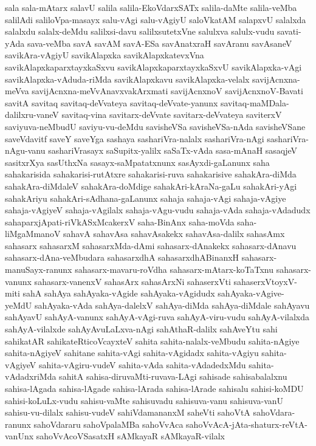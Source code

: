 {sala
sala-mAtarx
salavU
salila
salila-EkoVdarxSATx
salila-daMte
salila-veMba
salilAdi
saliloVpa-masayx
salu-vAgi
salu-vAgiyU
saloVkatAM
salapxvU
salalxda
salalxdu
salalx-deMdu
salilxsi-davu
salilxsutetxVne
salulxva
salulx-vudu
savati-yAda
sava-veMba
savA
savAM
savA-ESa
savAnatxraH
savAranu
savAsaneV
savikAra-vAgiyU
savikAlapxka
savikAlapxkatevxVna
savikAlapxkaparxtayxkaSxvu
savikAlapxkaparxtayxkaSxvU
savikAlapxka-vAgi
savikAlapxka-vAduda-riMda
savikAlapxkavu
savikAlapxka-velalx
savijAcnxna-meVva
savijAcnxna-meVvAnavxvakArxmati
savijAcnxnoV
savijAcnxnoV-Bavati
savitA
savitaq
savitaq-deVvateya
savitaq-deVvate-yanunx
savitaq-maMDala-dalilxru-vaneV
savitaq-vina
savitarx-deVvate
savitarx-deVvateya
saviterxV
saviyuva-neMbudU
saviyu-vu-deMdu
savisheVSa
savisheVSa-nAda
savisheVSane
saveVdavitf
saveY
saveYga
sashaya
sashariVra-nalalx
sashariVra-nAgi
sashariVra-nAgu-vanu
sashariVrasayx
saSupitx-yalilx
saSaTx-vAda
sasa-mAnaH
sasaqjeV
sasitxrXya
sasUthxNa
sasayx-saMpatatxnunx
sasAyxdi-gaLanunx
saha
sahakarisida
sahakarisi-rutAtxre
sahakarisi-ruva
sahakarisive
sahakAra-diMda
sahakAra-diMdaleV
sahakAra-doMdige
sahakAri-kAraNa-gaLu
sahakAri-yAgi
sahakAriyu
sahakAri-sAdhana-gaLanunx
sahaja
sahaja-vAgi
sahaja-vAgiye
sahaja-vAgiyeV
sahaja-vAgilalx
sahaja-vAgu-vudu
sahaja-vAda
sahaja-vAdadudx
sahaparxjApati-riVkASxMcakerxV
saha-BinAnx
saha-moVda
saha-liMgaMmanoV
sahavA
sahavAsa
sahavAsakekx
sahavAsa-dalilx
sahasAmx
sahasarx
sahasarxM
sahasarxMda-dAmi
sahasarx-dAnakekx
sahasarx-dAnavu
sahasarx-dAna-veMbudara
sahasarxdhA
sahasarxdhABinanxH
sahasarx-manuSayx-ranunx
sahasarx-mavaru-roVdha
sahasarx-mAtarx-koTaTxnu
sahasarx-vanunx
sahasarx-vanenxV
sahasArx
sahasArxNi
sahaserxVti
sahaserxVtoyxV-miti
sahA
sahAya
sahAyaka-vAgide
sahAyaka-vAgidudx
sahAyaka-vAgive-yeMdU
sahAyaka-vAda
sahAya-dalelxV
sahAya-diMda
sahAya-diMdale
sahAyavu
sahAyavU
sahAyA-vanunx
sahAyA-vAgi-ruva
sahAyA-viru-vudu
sahAyA-vilalxda
sahAyA-vilalxde
sahAyAvuLaLxva-nAgi
sahAthaR-dalilx
sahAveYtu
sahi
sahikatAR
sahikateRticoVcayxteV
sahita
sahita-nalalx-veMbudu
sahita-nAgiye
sahita-nAgiyeV
sahitane
sahita-vAgi
sahita-vAgidadx
sahita-vAgiyu
sahita-vAgiyeV
sahita-vAgiru-vudeV
sahita-vAda
sahita-vAdadedxMdu
sahita-vAdadxriMda
sahitA
sahisa-diruvaMti-ruvava-LAgi
sahisade
sahisabalalxnu
sahisa-lAgada
sahisa-lAgade
sahisa-lArada
sahisa-lArade
sahisalu
sahisi-koMDU
sahisi-koLuLx-vudu
sahisu-vaMte
sahisuvadu
sahisuva-vanu
sahisuva-vanU
sahisu-vu-dilalx
sahisu-vudeV
sahiVdamananxM
saheVti
sahoVtA
sahoVdara-ranunx
sahoVdararu
sahoVpalaMBa
sahoVvAca
sahoVvAcA-jAta-shaturx-reVtA-vanUnx
sahoVvAcoVSasatxH
sAMkayaR
sAMkayaR-vilalx
}
